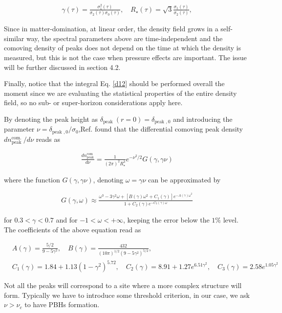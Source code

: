 \begin{appendices}
\begin{align}
    \gamma(\tau)=\frac{\sigma_{1}^{2}(\tau)}{\sigma_{2}(\tau) \sigma_{0}(\tau)}, \quad R_{\star}(\tau)=\sqrt{3} \frac{\sigma_{1}(\tau)}{\sigma_{2}(\tau)}, \label{d14}
\end{align}

Since in matter-domination, at linear order, the density field grows in a self-similar way, the spectral parameters above are time-independent and the comoving density of peaks does not depend on the time at which the density is measured, but this is not the case when pressure effects are important. The issue will be further discussed in section 4.2.

Finally, notice that the integral Eq. \ref{d12} should be performed overall the moment since we are evaluating the statistical properties of the entire density field, so no sub- or super-horizon considerations apply here.

By denoting the peak height as $\delta_{\text {peak }}(r=0)=\delta_{\text {peak }, 0}$ and introducing the parameter $\nu=\delta_{\text {peak }, 0} / \sigma_{0}$,Ref. \cite{1986ApJ...304...15B} found that the differential comoving peak density $d n_{\text {peak }}^{\text {com. }} / d \nu$ reads as

\begin{align}
    \frac{d n_{\mathrm{peak}}^{\text {com }}}{d \nu}=\frac{1}{(2 \pi)^{2} R_{\star}^{3}} e^{-\nu^{2} / 2} G(\gamma, \gamma \nu)
\end{align}

where the function $G(\gamma, \gamma \nu)$, denoting $\omega=\gamma \nu$ can be approximated by

\begin{align}
    G(\gamma, \omega) \approx \frac{\omega^{3}-3 \gamma^{2} \omega+\left[B(\gamma) \omega^{2}+C_{1}(\gamma)\right] e^{-A(\gamma) \omega^{2}}}{1+C_{2}(\gamma) e^{-C_{3}(\gamma) \omega}}
\end{align}

for $0.3<\gamma<0.7$ and for $-1<\omega<+\infty$, keeping the error below the $1 \%$ level. The coefficients of the above equation read as

\begin{align}
    & A(\gamma)=\frac{5 / 2}{9-5 \gamma^{2}}, \quad B(\gamma)=\frac{432}{(10 \pi)^{1 / 2}\left(9-5 \gamma^{2}\right)^{5 / 2}}, \\
    & C_{1}(\gamma)=1.84+1.13\left(1-\gamma^{2}\right)^{5.72}, \quad C_{2}(\gamma)=8.91+1.27 e^{6.51 \gamma^{2}}, \quad C_{3}(\gamma)=2.58 e^{1.05 \gamma^{2}}
\end{align}

Not all the peaks will correspond to a site where a more complex structure will form. Typically we have to introduce some threshold criterion, in our case, we ask $\nu>\nu_{c}$ to have PBHs formation.

\end{appendices}